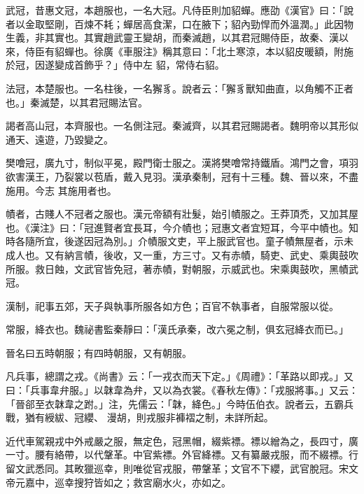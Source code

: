 \begin{pinyinscope}
 武冠，昔惠文冠，本趙服也，一名大冠。凡侍臣則加貂蟬。應劭《漢官》曰：「說者以金取堅剛，百煉不耗；蟬居高食潔，口在腋下；貂內勁悍而外溫潤。」此因物生義，非其實也。其實趙武靈王變胡，而秦滅趙，以其君冠賜侍臣，故秦、漢以來，侍臣有貂蟬也。徐廣《車服注》稱其意曰：「北土寒涼，本以貂皮暖額，附施於冠，因遂變成首飾乎？」侍中左
 貂，常侍右貂。



 法冠，本楚服也。一名柱後，一名獬豸。說者云：「獬豸獸知曲直，以角觸不正者也。」秦滅楚，以其君冠賜法官。



 謁者高山冠，本齊服也。一名側注冠。秦滅齊，以其君冠賜謁者。魏明帝以其形似通天、遠遊，乃毀變之。



 樊噲冠，廣九寸，制似平冕，殿門衛士服之。漢將樊噲常持鐵盾。鴻門之會，項羽欲害漢王，乃裂裳以苞盾，戴入見羽。漢承秦制，冠有十三種。魏、晉以來，不盡施用。今志
 其施用者也。



 幘者，古賤人不冠者之服也。漢元帝額有壯髮，始引幘服之。王莽頂禿，又加其屋也。《漢注》曰：「冠進賢者宜長耳，今介幘也；冠惠文者宜短耳，今平中幘也。知時各隨所宜，後遂因冠為別。」介幘服文吏，平上服武官也。童子幘無屋者，示未成人也。又有納言幘，後收，又一重，方三寸。又有赤幘，騎吏、武史、乘輿鼓吹所服。救日蝕，文武官皆免冠，著赤幘，對朝服，示威武也。宋乘輿鼓吹，黑幘武冠。



 漢制，祀事五郊，天子與執事所服各如方色；百官不執事者，自服常服以從。



 常服，絳衣也。魏祕書監秦靜曰：「漢氏承秦，改六冕之制，俱玄冠絳衣而已。」



 晉名曰五時朝服；有四時朝服，又有朝服。



 凡兵事，總謂之戎。《尚書》云：「一戎衣而天下定。」《周禮》：「革路以即戎。」又曰：「兵事韋弁服。」以韎韋為弁，又以為衣裳。《春秋左傳》：「戎服將事。」又云：「晉郤至衣韎韋之跗。」注，先儒云：「韎，絳色。」今時伍伯衣。說者云，五霸兵戰，猶有綬紱、冠纓、
 漫胡，則戎服非褲褶之制，未詳所起。



 近代車駕親戎中外戒嚴之服，無定色，冠黑帽，綴紫褾。褾以繒為之，長四寸，廣一寸。腰有絡帶，以代鞶革。中官紫褾。外官絳褾。又有纂嚴戎服，而不綴褾。行留文武悉同。其畋獵巡幸，則唯從官戎服，帶鞶革；文官不下纓，武官脫冠。宋文帝元嘉中，巡幸搜狩皆如之；救宮廟水火，亦如之。




\end{pinyinscope}
